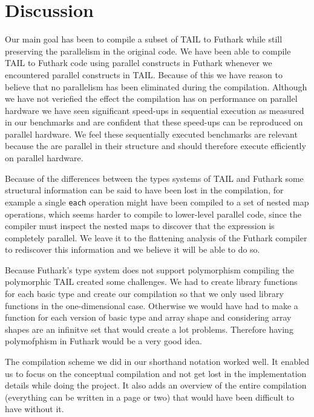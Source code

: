 \documentclass[11pt]{article}
\begin{document}
\section{Discussion}
Our main goal has been to compile a subset of TAIL \cite{ElsmanDybdal:Array:2014} to Futhark while still preserving the parallelism in the original code. 
We have been able to compile TAIL to Futhark code using parallel constructs in Futhark whenever we encountered parallel constructs in TAIL.
Because of this we have reason to believe that no parallelism has been eliminated during the compilation.
Although we have not veriefied the effect the compilation has on performance on parallel hardware we have seen significant speed-ups
in sequential execution as measured in our benchmarks and are confident that these speed-ups can be reproduced on parallel hardware.
We feel these sequentially executed benchmarks are relevant because the are parallel in their structure and should therefore
execute efficiently on parallel hardware.

Because of the differences between the types systems of TAIL and Futhark some structural information can be said to have been lost
in the compilation, for example a single {\tt each} operation might have been compiled to a set of nested map operations,
which seems harder to compile to lower-level parallel code, since the compiler must inspect the nested maps to discover that
the expression is completely parallel. We leave it to the flattening analysis of the Futhark compiler to rediscover this
information and we believe it will be able to do so.

Because Futhark's type system does not support polymorphism compiling the polymorphic TAIL created some challenges.
We had to create library functions for each basic type and create our compilation so that we only used library functions in the one-dimensional case.
Otherwise we would have had to make a function for each version of basic type and array shape and considering array shapes are an infinitve set that would create a lot problems. Therefore having polymofphism in Futhark would be a very good idea.

The compilation scheme we did in our shorthand notation worked well.
It enabled us to focus on the conceptual compilation and not get lost in the implementation details while doing the project.
It also adds an overview of the entire compilation (everything can be written in a page or two) that would have been difficult to have without it.
\end{document}
